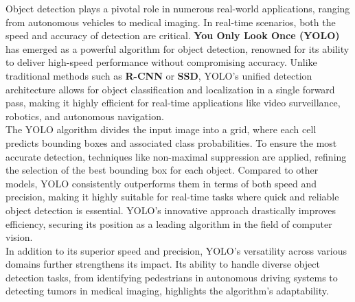 %
%
%
Object detection plays a pivotal role in numerous real-world applications, ranging from autonomous vehicles to medical imaging. In real-time scenarios, both the speed and accuracy of detection are critical. \textbf{You Only Look Once (YOLO)} has emerged as a powerful algorithm for object detection, renowned for its ability to deliver high-speed performance without compromising accuracy. 
%
Unlike traditional methods such as \textbf{R-CNN} or \textbf{SSD}, YOLO’s unified detection architecture allows for object classification and localization in a single forward pass, making it highly efficient for real-time applications like video surveillance, robotics, and autonomous navigation.\\[0.5cm]
%
The YOLO algorithm divides the input image into a grid, where each cell predicts bounding boxes and associated class probabilities. To ensure the most accurate detection, techniques like non-maximal suppression are applied, refining the selection of the best bounding box for each object. Compared to other models, YOLO consistently outperforms them in terms of both speed and precision, making it highly suitable for real-time tasks where quick and reliable object detection is essential. YOLO's innovative approach drastically improves efficiency, securing its position as a leading algorithm in the field of computer vision.\\[0.5cm]
%
In addition to its superior speed and precision, YOLO's versatility across various domains further strengthens its impact. Its ability to handle diverse object detection tasks, from identifying pedestrians in autonomous driving systems to detecting tumors in medical imaging, highlights the algorithm’s adaptability. 
